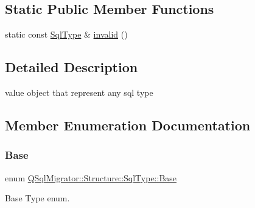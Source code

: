 \subsection*{Static Public Member Functions}
\begin{DoxyCompactItemize}
\item 
static const \hyperlink{class_q_sql_migrator_1_1_structure_1_1_sql_type}{Sql\+Type} \& \hyperlink{class_q_sql_migrator_1_1_structure_1_1_sql_type_afa9de070483ba42c6070d80454c3e4ca}{invalid} ()
\end{DoxyCompactItemize}


\subsection{Detailed Description}
value object that represent any sql type 

\subsection{Member Enumeration Documentation}
\mbox{\label{class_q_sql_migrator_1_1_structure_1_1_sql_type_ac1733fcbed79941acd89bcf3196d9912}} 
\subsubsection{\texorpdfstring{Base}{Base}}
{\footnotesize\ttfamily enum \hyperlink{class_q_sql_migrator_1_1_structure_1_1_sql_type_ac1733fcbed79941acd89bcf3196d9912}{Q\+Sql\+Migrator\+::\+Structure\+::\+Sql\+Type\+::\+Base}}



Base Type enum. 

